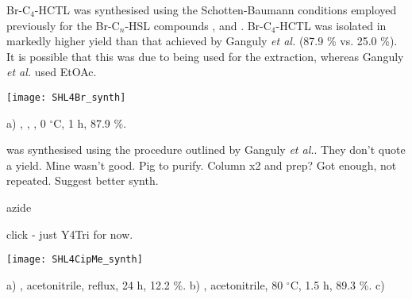 Br-C$_4$-HCTL  was synthesised using the Schotten-Baumann conditions employed previously for the Br-C$_n$-HSL compounds ,  and . Br-C$_4$-HCTL  was isolated in markedly higher yield than that achieved by Ganguly \textit{et al.} (87.9 \% vs. 25.0 \%). It is possible that this was due to  being used for the extraction, whereas Ganguly \textit{et al.} used EtOAc.

\begin{scheme}[H]
	\begin{center}
		\texttt{[image: SHL4Br\_synth]}
		\caption{a) , , , 0 $^{\circ}$C, 1 h, 87.9 \%.\label{sch:SHL4Br_synth}}
	\end{center}
\end{scheme}

 was synthesised using the procedure outlined by Ganguly \textit{et al.}. They don't quote a yield. Mine wasn't good.
Pig to purify. Column x2 and prep?
Got enough, not repeated.
Suggest better synth.

azide

click - just Y4Tri for now.


\begin{scheme}[H]
	\begin{center}
		\texttt{[image: SHL4CipMe\_synth]}
		\caption{
			a) , acetonitrile, reflux, 24 h, 12.2 \%.
			b) , acetonitrile, 80 $^{\circ}$C, 1.5 h, 89.3 \%.
			c) 
			\label{sch:SHL4CipMe_synth}}
	\end{center}
\end{scheme}


